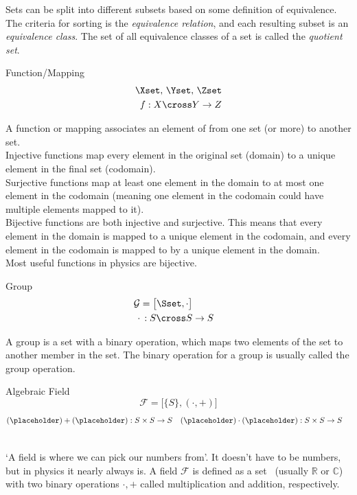 	Sets can be split into different subsets based on some definition of equivalence. The criteria for sorting is the \emph{equivalence relation}, and each resulting subset is an \emph{equivalence class}. The set of all equivalence classes of a set is called the \emph{quotient set}.
	\newpage
	\begin{mathbox}{Function/Mapping}
		\begin{align*}
			\Xset,\,\Yset,\,\Zset
			\\
			f: X\cross Y\rightarrow Z
		\end{align*}
	\end{mathbox}
	A function or mapping associates an element of from one set (or more) to another set.  
	\\
	Injective functions map every element in the original set (domain) to a unique element in the final set (codomain).
	\\
	Surjective functions map at least one element in the domain to at most one element in the codomain (meaning one element in the codomain could have multiple elements mapped to it). 
	\\
	Bijective functions are both injective and surjective. This means that every element in the domain is mapped to a unique element in the codomain, and every element in the codomain is mapped to by a unique element in the domain.
	\\
	Most useful functions in physics are bijective.
	\newpage
	\begin{mathbox}{Group}
		\begin{align*}
			\mathcal{G}=\big[\Sset,\cdot\big]
			\\
			{\bf\cdot}\,:S\cross S&\rightarrow S
		\end{align*}
	\end{mathbox}
	A group is a set with a binary operation, which maps two elements of the set to another member in the set. The binary operation for a group is usually called the group operation. 
	\begin{mathbox}{Algebraic Field}
		\begin{equation*}
			\mathcal{F}=\big[\{S\},(\cdot,+)\big]
		\end{equation*}
		\begin{align*}
			(\placeholder)+(\placeholder):S\times S&\rightarrow S
			&
			(\placeholder)\cdot(\placeholder):S\times S&\rightarrow S
		\end{align*}
	\end{mathbox}
\\
`A field is where we can pick our numbers from'. It doesn't have to be numbers, but in physics it nearly always is. A field \(\mathcal{F}\) is defined as a set \Sset\ (usually \(\mathbb{R}\) or \(\mathbb{C}\)) with two binary operations \(\cdot,+\) called multiplication and addition, respectively.
